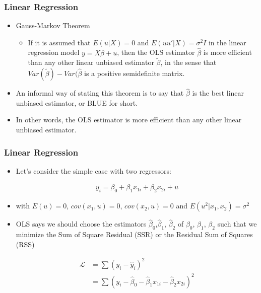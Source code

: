 \documentclass[
  shownotes,
  xcolor={svgnames},
  hyperref={colorlinks,citecolor=DarkBlue,linkcolor=andesred,urlcolor=DarkBlue}
  , aspectratio=169]{beamer}
\begin{document}
\begin{frame}
\frametitle{Linear Regression}


\begin{itemize}
\item Gauss-Markov Theorem
 \medskip
\begin{itemize}
\item If it is assumed that $E(u|X) = 0$ and $E(uu'|X) = \sigma^2I$ in the linear regression model $y = X\beta+u $, then the OLS estimator $\hat{\beta}$ is more efficient than any other linear unbiased estimator $\tilde{\beta}$, in the sense that $Var(\tilde{\beta})-Var(\hat{\beta}$ is a positive semidefinite matrix. 

\end{itemize}
 \medskip
 \item An informal way of stating this theorem is to say that $\hat{\beta}$ is the best linear unbiased estimator, or BLUE for short.
 \medskip
 \item In other words, the OLS estimator is more efficient than any other linear unbiased estimator.

\end{itemize}

\end{frame}

\begin{frame}
\frametitle{Linear Regression}

\begin{itemize}

\item Let's consider the simple case with two regressors:

\begin{align}
y_{i}=\beta_{0}+\beta_{1}x_{1i}+\beta_{2}x_{2i}+u
\end{align}


\item with $E(u)=0$, $cov(x_{1},u)=0$, $cov(x_{2},u)=0$ and $E(u^2|x_1,x_2) = \sigma^2$
\medskip
\item OLS says we should choose the estimators $\hat{\beta}_{0}$,$\hat{\beta}_{1}$, $\hat{\beta}_{2}$ of $\beta_{0}$, $\beta_{1}$, $\beta_{2} $ such that we minimize the Sum of Square Residual (SSR) or the Residual Sum of Squares (RSS)

\begin{align}
\mathcal{L}&= \sum\left(y_{i}-\hat{y}_i\right)^{2} \\
&=\sum\left(y_{i}-\hat{\beta}_{0}-\hat{\beta}_{1}x_{1i}-\hat{\beta}_{2}x_{2i}\right)^{2} 
\end{align}

\end{itemize}
\end{frame}
\end{document}
